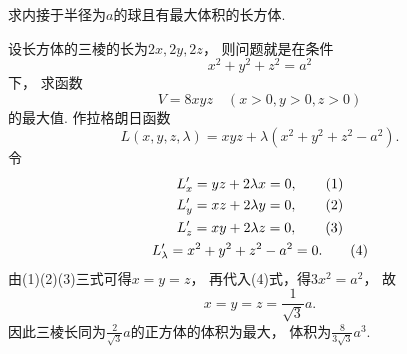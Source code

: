 \begin{example}
求内接于半径为\(a\)的球且有最大体积的长方体.
\begin{solution}
设长方体的三棱的长为\(2x,2y,2z\)，
则问题就是在条件\begin{equation*}
	x^2+y^2+z^2 = a^2
\end{equation*}下，
求函数\begin{equation*}
	V = 8xyz
	\quad (x>0,y>0,z>0)
\end{equation*}的最大值.
作拉格朗日函数\begin{equation*}
	L(x,y,z,\lambda)
	= xyz + \lambda(x^2+y^2+z^2-a^2).
\end{equation*}
令\begin{gather*}
	L'_x = yz + 2\lambda x = 0, \tag1 \\
	L'_y = xz + 2\lambda y = 0, \tag2 \\
	L'_z = xy + 2\lambda z = 0, \tag3 \\
	L'_\lambda = x^2+y^2+z^2-a^2 = 0. \tag4
\end{gather*}
由(1)(2)(3)三式可得\(x = y = z\)，
再代入(4)式，得\(3 x^2 = a^2\)，
故\begin{equation*}
	x = y = z = \frac1{\sqrt3} a.
\end{equation*}
因此三棱长同为\(\frac2{\sqrt3} a\)的正方体的体积为最大，
体积为\(\frac8{3\sqrt3} a^3\).
\end{solution}
\end{example}
